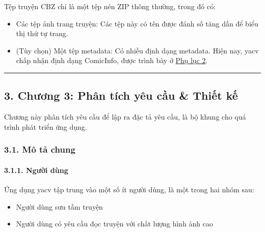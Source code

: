Tệp truyện CBZ chỉ là một tệp nén ZIP thông thường, trong đó có:

\begin{itemize}
  
  \item
        Các tệp ảnh trang truyện: Các tệp này có tên được đánh số tăng dần để
        biểu thị thứ tự trang.
  \item
        (Tùy chọn) Một tệp metadata: Có nhiều định dạng metadata. Hiện nay,
        yacv chấp nhận định dạng ComicInfo, được trình bày ở
        \protect\hyperlink{P8.2-comicinfo.xsd}{Phụ lục 2}.
\end{itemize}

\begin{center}\rule{0.5\linewidth}{0.5pt}\end{center}

\hypertarget{chux1b0ux1a1ng-3-phuxe2n-tuxedch-yuxeau-cux1ea7u-thiux1ebft-kux1ebf}{%
  \subsection{\texorpdfstring{3. Chương 3: Phân tích yêu cầu \& Thiết kế
    }{3. Chương 3: Phân tích yêu cầu \& Thiết kế }}\label{chux1b0ux1a1ng-3-phuxe2n-tuxedch-yuxeau-cux1ea7u-thiux1ebft-kux1ebf}}

Chương này phân tích yêu cầu để lập ra đặc tả yêu cầu, là bộ khung cho
quá trình phát triển ứng dụng.

\hypertarget{muxf4-tux1ea3-chung}{%
  \subsubsection{\texorpdfstring{3.1. Mô tả chung
    }{3.1. Mô tả chung }}\label{muxf4-tux1ea3-chung}}

\hypertarget{ngux1b0ux1eddi-duxf9ng}{%
  \paragraph{\texorpdfstring{3.1.1. Người dùng
    }{3.1.1. Người dùng }}\label{ngux1b0ux1eddi-duxf9ng}}

Ứng dụng yacv tập trung vào một số ít người dùng, là một trong hai nhóm
sau:

\begin{itemize}
  
  \item
        Người dùng sưu tầm truyện
  \item
        Người dùng có yêu cầu đọc truyện với chất lượng hình ảnh cao
\end{itemize}

